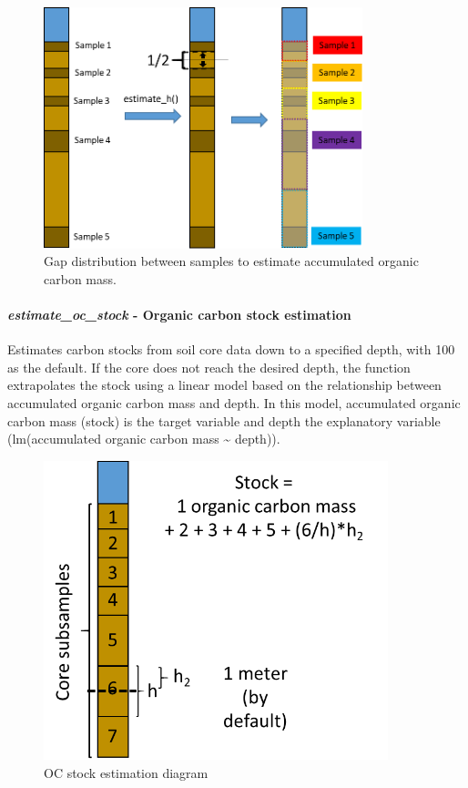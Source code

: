 \documentclass[10pt,a4paper,onecolumn]{article}
\let\oldparagraph\paragraph
\renewcommand{\paragraph}[1]{\oldparagraph{#1}\mbox{}}
\begin{document}
\begin{figure}
\centering
\includegraphics[width=3.64583in,height=\textheight,keepaspectratio]{images/estimate_h-01.png}
\caption{Gap distribution between samples to estimate accumulated
organic carbon mass.}
\end{figure}

\paragraph{\texorpdfstring{\textbf{\emph{estimate\_oc\_stock}} \textbf{-
Organic carbon stock
estimation}}{estimate\_oc\_stock - Organic carbon stock estimation}}\label{estimate_oc_stock---organic-carbon-stock-estimation}

Estimates carbon stocks from soil core data down to a specified depth,
with 100 as the default. If the core does not reach the desired depth,
the function extrapolates the stock using a linear model based on the
relationship between accumulated organic carbon mass and depth. In this
model, accumulated organic carbon mass (stock) is the target variable
and depth the explanatory variable (lm(accumulated organic carbon mass
\textasciitilde{} depth)).

\begin{figure}
\centering
\includegraphics[width=3.9375in,height=\textheight,keepaspectratio]{images/estimate_stock-01.png}
\caption{OC stock estimation diagram}
\end{figure}
\end{document}

